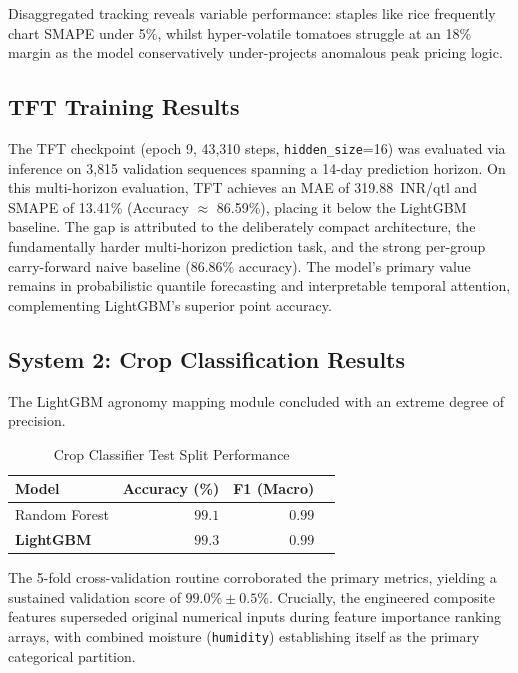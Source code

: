 \documentclass[conference]{IEEEtran}
\begin{document}
Disaggregated tracking reveals variable performance: staples like rice frequently chart SMAPE under 5\%, whilst hyper-volatile tomatoes struggle at an 18\% margin as the model conservatively under-projects anomalous peak pricing logic.

\subsection{TFT Training Results}
The TFT checkpoint (epoch 9, 43{,}310 steps, \texttt{hidden\_size}=16) was evaluated via inference on 3{,}815 validation sequences spanning a 14-day prediction horizon. On this multi-horizon evaluation, TFT achieves an MAE of 319.88~INR/qtl and SMAPE of 13.41\% (Accuracy $\approx$ 86.59\%), placing it below the LightGBM baseline. The gap is attributed to the deliberately compact architecture, the fundamentally harder multi-horizon prediction task, and the strong per-group carry-forward naive baseline (86.86\% accuracy). The model's primary value remains in probabilistic quantile forecasting and interpretable temporal attention, complementing LightGBM's superior point accuracy.

\subsection{System 2: Crop Classification Results}

The LightGBM agronomy mapping module concluded with an extreme degree of precision.

\begin{table}[H]
\centering
\caption{Crop Classifier Test Split Performance}
\label{tab:crop_results}
\begin{tabular}{lrrr}
\toprule
\textbf{Model} & \textbf{Accuracy (\%)} & \textbf{F1 (Macro)} \\
\midrule
Random Forest & $99.1$ & $0.99$ \\
\textbf{LightGBM} & \textbf{$99.3$} & \textbf{$0.99$} \\
\bottomrule
\end{tabular}
\end{table}

The 5-fold cross-validation routine corroborated the primary metrics, yielding a sustained validation score of $99.0\% \pm 0.5\%$. Crucially, the engineered composite features superseded original numerical inputs during feature importance ranking arrays, with combined moisture (\texttt{humidity}) establishing itself as the primary categorical partition.
\end{document}
